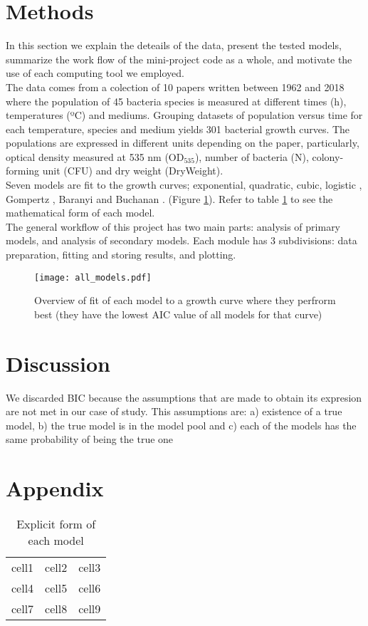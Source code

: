 \documentclass[titlepage,11pt]{article}
\begin{document}
\begin{linenumbers}
	\section{Methods}\label{methods}
	In this section we explain the deteails of the data, present the tested models, summarize the work flow of the mini-project code as a whole, and motivate the use of each computing tool we employed.\\
	
	The data comes from a colection of 10 papers written between 1962 and 2018 where the population of 45 bacteria species is measured at different times (h), temperatures (ºC) and mediums. Grouping datasets of population versus time for each temperature, species and medium yields 301 bacterial growth curves. The populations are expressed in different units depending on the paper, particularly,  optical density measured at 535 nm (OD$_{535} $), number of bacteria (N), colony-forming unit (CFU) and dry weight (DryWeight).\\
	Seven models are fit to the growth curves; exponential, quadratic, cubic, logistic \cite{Pearl1920, Verhulst1838}, Gompertz \cite{Zwietering1990}, Baranyi \cite{Baranyi1994} and Buchanan \cite{Buchanan1997}. (Figure \ref{all_models}). Refer to table \ref{tab:model_eqs} to see the mathematical form of each model.\\
	
	The general workflow of this project has two main parts: analysis of primary models, and analysis of secondary models.  Each module has 3 subdivisions: data preparation, fitting and storing results, and plotting. 
	
	\begin{figure}[h]
		\texttt{[image: all\_models.pdf]}
		\centering
		\caption{Overview of fit of each model to a growth curve where they perfrorm best (they have the lowest AIC value of all models for that curve)}
		\label{all_models}
	\end{figure}
	
	\section{Discussion}
	We discarded BIC because the assumptions that are made to obtain its expresion are not met in our case of study. This assumptions are: a) existence of a true model, b) the true model is in the model pool and c) each of the  models has the same probability of being the true one 
	
	\newpage
	\section{Appendix}
	\begin{table}[h]
		\centering
		\begin{tabular}{ c c c }
			cell1 & cell2 & cell3 \\ 
			cell4 & cell5 & cell6 \\  
			cell7 & cell8 & cell9    
		\end{tabular}
		\caption{\label{tab:model_eqs}Explicit form of each model}
	\end{table}
	
\end{linenumbers}
\newpage


\end{document}
